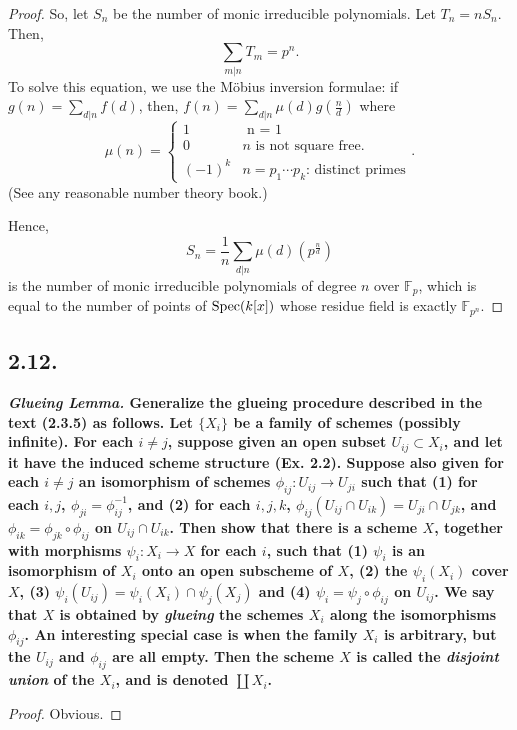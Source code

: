 \documentclass[11pt]{amsart}          %
\newcommand{\tuborg}{\left\{\begin{array}{ll}}
\newcommand{\sluttuborg}{\end{array}\right.}
\newcommand{\spec}{{\rm Spec}}
\begin{document}
\begin{proof}
So, let $S_n$ be the number of monic irreducible polynomials. Let $T_n = n S_n$. Then, $$\sum_{m | n } T_m = p ^n.$$ To solve this equation, we use the M\"obius inversion formulae: if $g(n) = \sum_{d|n} f(d)$, then, $f(n) = \sum_{d|n} \mu (d) g\left( \frac{n}{d} \right)$ where $$\mu(n) = \tuborg 1 & \mbox{ n = 1 } \\ 0 & n \mbox{ is not square free.} \\ (-1)^k & n = p_1 \cdots p_k \mbox{: distinct primes} \sluttuborg.$$ (See any reasonable number theory book.)

Hence, $$S_n = \frac{1}{n} \sum_{d |n} \mu(d) \left( p^{\frac{n}{d}} \right)$$ is the number of monic irreducible polynomials of degree $n$ over $\mathbb{F}_p$, which is equal to the number of points of $\spec (k[x])$ whose residue field is exactly $\mathbb{F}_{p^n}$.\end{proof}

\subsection*{2.12.}\textbf{{\it Glueing Lemma.} Generalize the glueing procedure described in the text (2.3.5) as follows. Let $\{ X_i \}$ be a family of schemes (possibly infinite). For each $i \not = j$, suppose given an open subset $U_{ij} \subset X_i$, and let it have the induced scheme structure (Ex. 2.2). Suppose also given for each $i \not = j$ an isomorphism of schemes $\phi_{ij}: U_{ij} \to U_{ji}$ such that (1) for each $i, j$, $\phi_{ji} = \phi_{ij} ^{-1}$, and (2) for each $i, j, k$, $\phi_{ij} (U_{ij} \cap U_{ik}) = U_{ji} \cap U_{jk}$, and $\phi_{ik} = \phi_{jk} \circ \phi_{ij}$ on $U_{ij} \cap U_{ik}$. Then show that there is a scheme $X$, together with morphisms $\psi_i : X_i \to X$ for each $i$, such that (1) $\psi_i$ is an isomorphism of $X_i$ onto an open subscheme of $X$, (2) the $\psi_i (X_i)$ cover $X$, (3) $\psi_i (U_{ij}) = \psi_i (X_i ) \cap \psi_j (X_j)$ and (4) $\psi_i = \psi_j \circ \phi_{ij}$ on $U_{ij}$. We say that $X$ is obtained by {\it glueing} the schemes $X_i$ along the isomorphisms $\phi_{ij}$. An interesting special case is when the family $X_i$ is arbitrary, but the $U_{ij}$ and $\phi_{ij}$ are all empty. Then the scheme $X$ is called the {\it disjoint union} of the $X_i$, and is denoted $\coprod X_i$.}

\begin{proof} Obvious. \end{proof}
\end{document}
